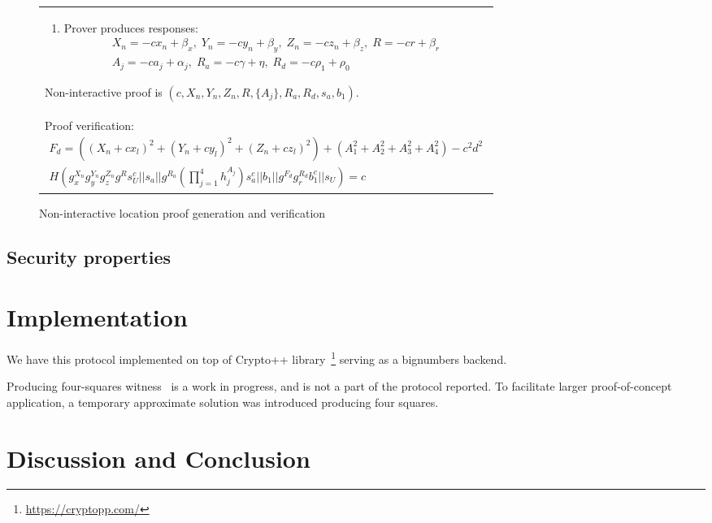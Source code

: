 \documentclass{article}
\begin{document}
\begin{figure}[!htb]
\begin{tabular}{|p{\linewidth}|}
\begin{enumerate}
\item
  Prover produces responses:
\begin{multline}
  X_n = -c x_n + \beta_x,  \;
  Y_n = -c y_n + \beta_y,  \;
  Z_n = -c z_n + \beta_z,   \;
  R = -c r + \beta_r   \\
  A_j = -c a_j + \alpha_j, \;
  R_a = -c \gamma + \eta,   \;
  R_d = -c \rho_1 + \rho_0
\end{multline}
\end{enumerate}
Non-interactive proof is
$(c, X_n, Y_n, Z_n, R, \{A_j\}, R_a, R_d, s_a, b_1)$.
\\
Proof verification:
\begin{multline}
\label{verf-chash}
  F_d = ((X_n + c x_l)^2 + (Y_n + c y_l)^2 + (Z_n + c z_l)^2) + (A_1^2 + A_2^2 + A_3^2 + A_4^2) - c^2 d^2 \\
  H(g_x^{X_n} g_y^{Y_n} g_z^{Z_n} g^{R} s_U^{c} ||
    s_a ||
    g^{R_a} (\prod_{j=1}^4 h_j^{A_j}) s_a^{c} ||
    b_1 ||
    g^{F_d} g_r^{R_d} b_1^c ||
    s_U)
  = c
\end{multline}
\\
\hline
\end{tabular}
\caption{Non-interactive location proof generation and verification}
\label{ni_fig}
\end{figure}

\subsection{Security properties}


\section{Implementation}

We have this protocol implemented on top of {Crypto++} library~\footnote{\url{https://cryptopp.com/}}
serving as a bignumbers backend.

Producing four-squares witness~\cite{PollackTrevino} is a work in progress, and is not a part of the protocol reported.
To facilitate larger proof-of-concept application, a temporary approximate solution was introduced producing four squares.

\section{Discussion and Conclusion}


% 


\end{document}
